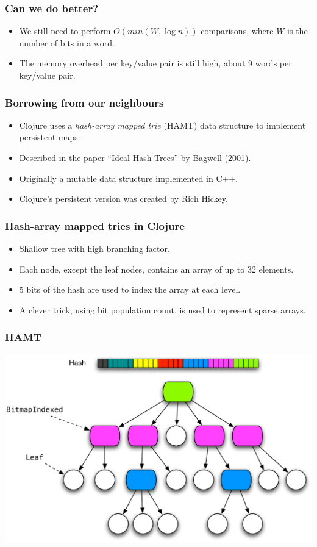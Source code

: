 \documentclass[xetex,mathserif,serif]{beamer}
\newcommand{\code}[1]{\mbox{\texttt{\small{\color{CodeColor}{#1}}}}}
\begin{document}
\begin{frame}
  \frametitle{Can we do better?}
  \begin{itemize}
  \item We still need to perform $O(min(W, \log n))$ \code{Int}
    comparisons, where $W$ is the number of bits in a word.
  \item The memory overhead per key/value pair is still high, about 9
    words per key/value pair.
  \end{itemize}
\end{frame}

\begin{frame}
  \frametitle{Borrowing from our neighbours}
  \begin{itemize}
  \item Clojure uses a \emph{hash-array mapped trie} (HAMT) data
    structure to implement persistent maps.
  \item Described in the paper ``Ideal Hash Trees'' by Bagwell (2001).
  \item Originally a mutable data structure implemented in C++.
  \item Clojure's persistent version was created by Rich Hickey.
  \end{itemize}
\end{frame}

\begin{frame}
  \frametitle{Hash-array mapped tries in Clojure}
  \begin{itemize}
  \item Shallow tree with high branching factor.
  \item Each node, except the leaf nodes, contains an array of up to
    32 elements.
  \item 5 bits of the hash are used to index the array at each level.
  \item A clever trick, using bit population count, is used to
    represent sparse arrays.
  \end{itemize}
\end{frame}

\begin{frame}
  \frametitle{HAMT}
  \includegraphics[width=\textwidth]{hamt.pdf}
\end{frame}
\end{document}
